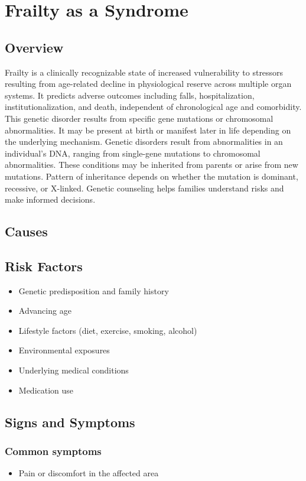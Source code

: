 \chapter{Frailty as a Syndrome}
\label{sec:Frailty as a Syndrome}

\section{Overview}
Frailty is a clinically recognizable state of increased vulnerability to stressors resulting from age-related decline in physiological reserve across multiple organ systems. It predicts adverse outcomes including falls, hospitalization, institutionalization, and death, independent of chronological age and comorbidity. This genetic disorder results from specific gene mutations or chromosomal abnormalities. It may be present at birth or manifest later in life depending on the underlying mechanism. Genetic disorders result from abnormalities in an individual's DNA, ranging from single-gene mutations to chromosomal abnormalities. These conditions may be inherited from parents or arise from new mutations. Pattern of inheritance depends on whether the mutation is dominant, recessive, or X-linked. Genetic counseling helps families understand risks and make informed decisions.
\section{Causes}
\section{Risk Factors}

\begin{itemize}[noitemsep]
  \item Genetic predisposition and family history
  \item Advancing age
  \item Lifestyle factors (diet, exercise, smoking, alcohol)
  \item Environmental exposures
  \item Underlying medical conditions
  \item Medication use
\end{itemize}
\section{Signs and Symptoms}

\subsection{Common symptoms}
\begin{itemize}[noitemsep]
  \item Pain or discomfort in the affected area
  \end{itemize}


